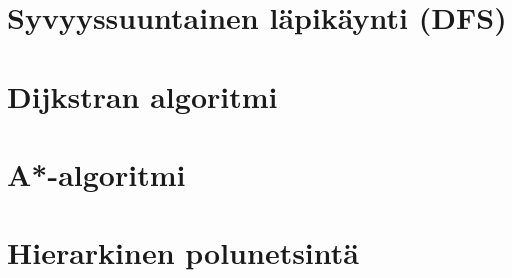 \section{Syvyyssuuntainen läpikäynti (DFS)}\label{dfs}
\section{Dijkstran algoritmi}\label{dijkstra}
\section{A*-algoritmi}\label{aStar}
\section{Hierarkinen polunetsintä}\label{hpa}
